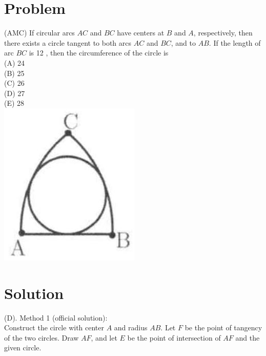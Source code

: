 \documentclass{article}
\begin{document}
\section*{Problem}
(AMC) If circular arcs \(A C\) and \(B C\) have centers at \(B\) and \(A\), respectively, then there exists a circle tangent to both arcs \(A C\) and \(B C\), and to \(A B\). If the length of arc \(B C\) is 12 , then the circumference of the circle is\\
(A) 24\\
(B) 25\\
(C) 26\\
(D) 27\\
(E) 28\\
\centering
\includegraphics[width=\textwidth]{images/208.jpg}

\section*{Solution}
(D).
Method 1 (official solution):\\
Construct the circle with center \(A\) and radius \(A B\). Let \(F\) be the point of tangency of the two circles. Draw \(A F\), and let \(E\) be the point of intersection of \(A F\) and the given circle.
\end{document}
